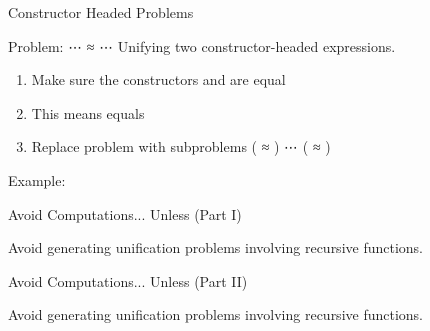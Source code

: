 \documentclass[compress,9pt]{beamer}
\begin{document}
\begin{frame}{Constructor Headed Problems}

  \begin{alertblock}{Problem: {  ⋯  ≈   ⋯ }}
    Unifying two constructor-headed expressions.
  \end{alertblock}

  \bigskip
  \begin{enumerate}
    \item Make sure the constructors  and  are equal
    \item This means  equals 
    \item Replace problem with subproblems {( ≈ ) ⋯ ( ≈ )}
  \end{enumerate}

  \bigskip Example:
\end{frame}

\begin{frame}{Avoid Computations... Unless (Part I)}

  Avoid generating unification problems involving recursive functions.

  \begin{minipage}{0.45\textwidth}
  \end{minipage}\begin{minipage}{0.45\textwidth}
  \end{minipage}
  \bigskip
\end{frame}

\begin{frame}{Avoid Computations... Unless (Part II)}

  Avoid generating unification problems involving recursive functions.

  \begin{minipage}{0.45\textwidth}
  \end{minipage}\begin{minipage}{0.45\textwidth}
  \end{minipage}
  \bigskip
\end{frame}
\end{document}
